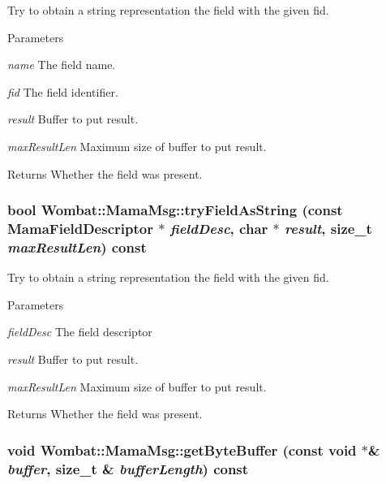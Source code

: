 Try to obtain a string representation the field with the given fid. 
\begin{DoxyParams}{Parameters}
\item[{\em name}]The field name. \item[{\em fid}]The field identifier. \item[{\em result}]Buffer to put result. \item[{\em maxResultLen}]Maximum size of buffer to put result. \end{DoxyParams}
\begin{DoxyReturn}{Returns}
Whether the field was present. 
\end{DoxyReturn}
\hypertarget{classWombat_1_1MamaMsg_a2d08a4d75c1d7ee68a2001581c33bf6b}{
\subsubsection[{tryFieldAsString}]{\setlength{\rightskip}{0pt plus 5cm}bool Wombat::MamaMsg::tryFieldAsString (const {\bf MamaFieldDescriptor} $\ast$ {\em fieldDesc}, \/  char $\ast$ {\em result}, \/  size\_\-t {\em maxResultLen}) const}}
\label{classWombat_1_1MamaMsg_a2d08a4d75c1d7ee68a2001581c33bf6b}


Try to obtain a string representation the field with the given fid. 
\begin{DoxyParams}{Parameters}
\item[{\em fieldDesc}]The field descriptor \item[{\em result}]Buffer to put result. \item[{\em maxResultLen}]Maximum size of buffer to put result. \end{DoxyParams}
\begin{DoxyReturn}{Returns}
Whether the field was present. 
\end{DoxyReturn}
\hypertarget{classWombat_1_1MamaMsg_ae632d484473700395069b3454598d9b0}{
\subsubsection[{getByteBuffer}]{\setlength{\rightskip}{0pt plus 5cm}void Wombat::MamaMsg::getByteBuffer (const void $\ast$\& {\em buffer}, \/  size\_\-t \& {\em bufferLength}) const}}
\label{classWombat_1_1MamaMsg_ae632d484473700395069b3454598d9b0}


